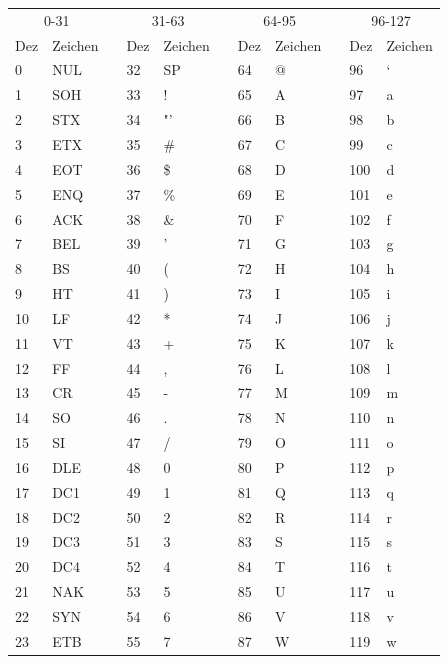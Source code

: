 \documentclass[12pt,a4paper, twoside=false]{scrartcl}
\renewcommand{\arraystretch}{1.3}
\newcommand{\ra}[1]{\renewcommand{\arraystretch}{#1}}
\begin{document}
\begin{table}[!htbp]\centering
\ra{1.1}
\begin{tabular}{@{}llcllcllcll@{}}
\toprule
\multicolumn{2}{c}{0-31} & & \multicolumn{2}{c}{31-63} & &
\multicolumn{2}{c}{64-95} & & \multicolumn{2}{c}{96-127}\\
\cmidrule{1-2} \cmidrule{4-5} \cmidrule{7-8} \cmidrule{10-11}
Dez & Zeichen & & Dez  & Zeichen & & Dez & Zeichen & & Dez  & Zeichen\\
\midrule
0  & NUL & & 32 &  SP & & 64 & @ & & 96  & ` \\
1  & SOH & & 33 &  !  & & 65 & A & & 97  & a \\
2  & STX & & 34 &  "' & & 66 & B & & 98  & b \\
3  & ETX & & 35 &  \# & & 67 & C & & 99  & c \\
4  & EOT & & 36 &  \$ & & 68 & D & & 100 & d \\
5  & ENQ & & 37 &  \% & & 69 & E & & 101 & e \\
6  & ACK & & 38 &  \& & & 70 & F & & 102 & f \\
7  & BEL & & 39 &  '  & & 71 & G & & 103 & g \\
8  & BS  & & 40 &  (  & & 72 & H & & 104 & h \\
9  & HT  & & 41 &  )  & & 73 & I & & 105 & i \\
10 & LF  & & 42 &  *  & & 74 & J & & 106 & j \\
11 & VT  & & 43 &  +  & & 75 & K & & 107 & k \\
12 & FF  & & 44 &  ,  & & 76 & L & & 108 & l \\
13 & CR  & & 45 &  -  & & 77 & M & & 109 & m \\
14 & SO  & & 46 &  .  & & 78 & N & & 110 & n \\
15 & SI  & & 47 &  /  & & 79 & O & & 111 & o \\
16 & DLE & & 48 &  0  & & 80 & P & & 112 & p \\
17 & DC1 & & 49 &  1  & & 81 & Q & & 113 & q \\
18 & DC2 & & 50 &  2  & & 82 & R & & 114 & r \\
19 & DC3 & & 51 &  3  & & 83 & S & & 115 & s \\
20 & DC4 & & 52 &  4  & & 84 & T & & 116 & t \\
21 & NAK & & 53 &  5  & & 85 & U & & 117 & u \\
22 & SYN & & 54 &  6  & & 86 & V & & 118 & v \\
23 & ETB & & 55 &  7  & & 87 & W & & 119 & w \\

\end{tabular}
\end{table}
\end{document}
